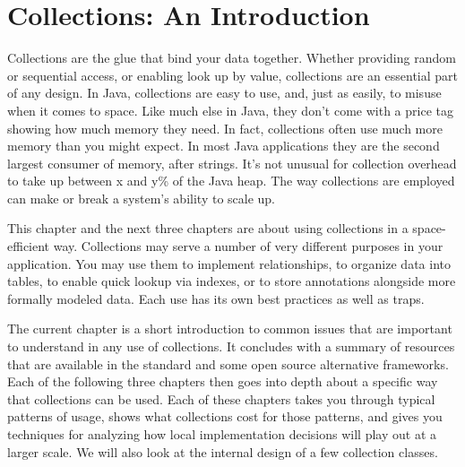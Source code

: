 \chapter{Collections: An Introduction}
\label{chapter:brief-introduction-collections}

Collections are the glue that bind your data together.  Whether
providing random or sequential access, or enabling
look up by value, collections are an essential part of any
design. In Java, collections are easy to use, and, just as easily, to misuse when
it comes to space. Like much else in Java, they don't come with a price tag
showing how much memory they need. In fact, collections
often use much more memory than you might expect. In most Java applications they are the
second largest consumer of memory, after
strings. It's not unusual for collection overhead to take up between x and y\%
of the Java heap. The way collections are employed can make
or break a system's ability to scale up.

This chapter and the next three chapters are about using
collections in a space-efficient way. 
Collections may serve a number of very
different purposes in your application. You may use them to implement
relationships, to organize data into tables, to enable quick lookup via indexes, or
to store annotations alongside more formally modeled data. Each use
has its own best practices as well as traps. 

The current chapter
is a short introduction to common issues that are important to understand in
any use of collections. It concludes with a summary of resources
that are available in the standard and some open source alternative
frameworks. Each of the following three
chapters then goes into depth about a specific way that collections can be
used. Each of these chapters takes
you through typical patterns of usage, shows what collections cost for those patterns,
and gives you techniques for analyzing how local implementation decisions will play out at a larger scale. 
We will also look at the internal design of a few collection
classes.

%

